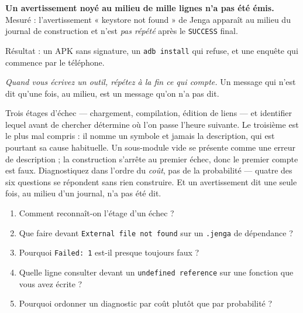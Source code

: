 \begin{nkpiege}
\textbf{Un avertissement noyé au milieu de mille lignes n'a pas été émis.}
Mesuré : l'avertissement « keystore not found » de Jenga apparaît au milieu du
journal de construction et n'est \emph{pas répété} après le \texttt{SUCCESS}
final.

Résultat : un APK sans signature, un \texttt{adb install} qui refuse, et une
enquête qui commence par le téléphone.

\emph{Quand vous écrivez un outil, répétez à la fin ce qui compte.} Un message
qui n'est dit qu'une fois, au milieu, est un message qu'on n'a pas dit.
\end{nkpiege}

\begin{nkbilan}
Trois étages d'échec --- chargement, compilation, édition de liens --- et
identifier lequel avant de chercher détermine où l'on passe l'heure suivante. Le
troisième est le plus mal compris : il nomme un symbole et jamais la description,
qui est pourtant sa cause habituelle. Un sous-module vide se présente comme une
erreur de description ; la construction s'arrête au premier échec, donc le
premier compte est faux. Diagnostiquez dans l'ordre du \emph{coût}, pas de la
probabilité --- quatre des six questions se répondent sans rien construire. Et un
avertissement dit une seule fois, au milieu d'un journal, n'a pas été dit.
\end{nkbilan}

\begin{nkquestions}
\begin{enumerate}
\item Comment reconnaît-on l'étage d'un échec ?
\item Que faire devant \texttt{External file not found} sur un \texttt{.jenga} de
      dépendance ?
\item Pourquoi \texttt{Failed: 1} est-il presque toujours faux ?
\item Quelle ligne consulter devant un \texttt{undefined reference} sur une
      fonction que vous avez écrite ?
\item Pourquoi ordonner un diagnostic par coût plutôt que par probabilité ?
\end{enumerate}
\end{nkquestions}

